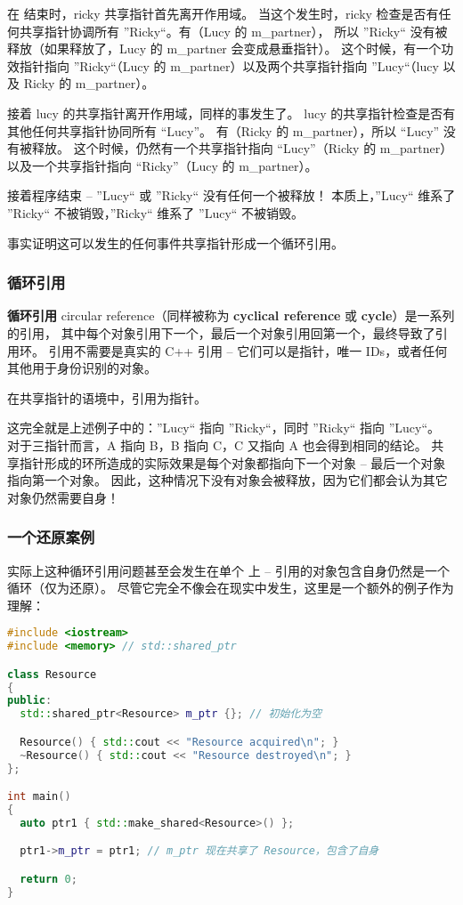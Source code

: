 \documentclass[../../LearnCpp.tex]{subfiles}
\begin{document}
在  结束时，ricky 共享指针首先离开作用域。
当这个发生时，ricky 检查是否有任何共享指针协调所有 ”Ricky“。有（Lucy 的 m\_partner），
所以 ”Ricky“ 没有被释放（如果释放了，Lucy 的 m\_partner 会变成悬垂指针）。
这个时候，有一个功效指针指向 ”Ricky“（Lucy 的 m\_partner）以及两个共享指针指向 ”Lucy“（lucy 以及 Ricky 的 m\_partner）。

接着 lucy 的共享指针离开作用域，同样的事发生了。
lucy 的共享指针检查是否有其他任何共享指针协同所有 “Lucy”。
有（Ricky 的 m\_partner），所以 “Lucy” 没有被释放。
这个时候，仍然有一个共享指针指向 “Lucy”（Ricky 的 m\_partner）以及一个共享指针指向 “Ricky”（Lucy 的 m\_partner）。

接着程序结束 -- ”Lucy“ 或 ”Ricky“ 没有任何一个被释放！
本质上，”Lucy“ 维系了 ”Ricky“ 不被销毁，”Ricky“ 维系了 ”Lucy“ 不被销毁。

事实证明这可以发生的任何事件共享指针形成一个循环引用。

\subsubsection*{循环引用}

\textbf{循环引用} circular reference（同样被称为 \textbf{cyclical reference} 或 \textbf{cycle}）是一系列的引用，
其中每个对象引用下一个，最后一个对象引用回第一个，最终导致了引用环。
引用不需要是真实的 C++ 引用 -- 它们可以是指针，唯一 IDs，或者任何其他用于身份识别的对象。

在共享指针的语境中，引用为指针。

这完全就是上述例子中的：”Lucy“ 指向 ”Ricky“，同时 ”Ricky“ 指向 ”Lucy“。
对于三指针而言，A 指向 B，B 指向 C，C 又指向 A 也会得到相同的结论。
共享指针形成的环所造成的实际效果是每个对象都指向下一个对象 -- 最后一个对象指向第一个对象。
因此，这种情况下没有对象会被释放，因为它们都会认为其它对象仍然需要自身！

\subsubsection*{一个还原案例}

实际上这种循环引用问题甚至会发生在单个  上 --
 引用的对象包含自身仍然是一个循环（仅为还原）。
尽管它完全不像会在现实中发生，这里是一个额外的例子作为理解：

\begin{lstlisting}[language=C++]
#include <iostream>
#include <memory> // std::shared_ptr

class Resource
{
public:
  std::shared_ptr<Resource> m_ptr {}; // 初始化为空

  Resource() { std::cout << "Resource acquired\n"; }
  ~Resource() { std::cout << "Resource destroyed\n"; }
};

int main()
{
  auto ptr1 { std::make_shared<Resource>() };

  ptr1->m_ptr = ptr1; // m_ptr 现在共享了 Resource，包含了自身

  return 0;
}
\end{lstlisting}
\end{document}
